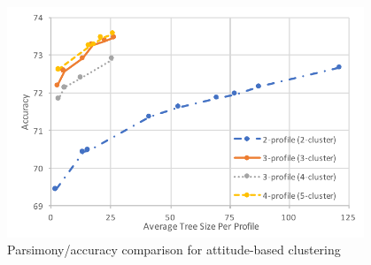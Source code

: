 \begin{figure}
	\centering
	\includegraphics[width=0.95\textwidth]{figures/attitudeSum2.pdf}
	\caption{Parsimony/accuracy comparison for attitude-based clustering}
	\label{fig:attitudesum}
\end{figure}

